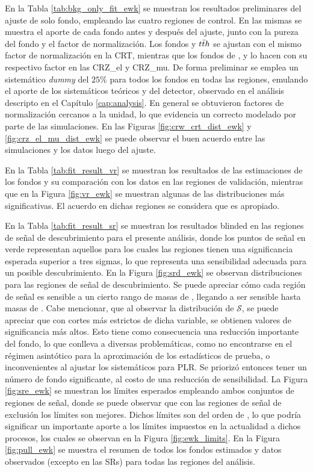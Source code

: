 En la Tabla \ref{tab:bkg_only_fit_ewk} se muestran los resultados preliminares del ajuste de solo fondo, empleando las cuatro regiones de control. En las mismas se muestra el aporte de cada fondo antes y después del ajuste, junto con la pureza del fondo y el factor de normalización. Los fondos \ttbarph y $t\bar{t} h$ se ajustan con el mismo factor de normalización en la CRT, mientras que los fondos de \znunuph, \zeeph y \zmumuph lo hacen con su respectivo factor en las CRZ\_el y CRZ\_mu. De forma preliminar se emplea un sistemático \textit{dummy} del $25\%$ para todos los fondos en todas las regiones, emulando el aporte de los sistemáticos teóricos y del detector, observado en el análisis descripto en el Capítulo \ref{cap:analysis}. En general se obtuvieron factores de normalización cercanos a la unidad, lo que evidencia un correcto modelado por parte de las simulaciones. En las Figuras \ref{fig:crw_crt_dist_ewk} y \ref{fig:crz_el_mu_dist_ewk} se puede observar el buen acuerdo entre las simulaciones y los datos luego del ajuste.


En la Tabla \ref{tab:fit_result_vr} se muestran los resultados de las estimaciones de los fondos y su comparación con los datos en las regiones de validación, mientras que en la Figura \ref{fig:vr_ewk} se muestran algunas de las distribuciones más significativas. El acuerdo en dichas regiones se considera que es apropiado. 

En la Tabla \ref{tab:fit_result_sr} se muestran los resultados blinded en las regiones de señal de descubrimiento para el presente análisis, donde los puntos de señal en verde representan aquellos para los cuales las regiones tienen una significancia esperada superior a tres sigmas, lo que representa una sensibilidad adecuada para un posible descubrimiento. En la Figura \ref{fig:srd_ewk} se observan distribuciones para las regiones de señal de descubrimiento. Se puede apreciar cómo cada región de señal es sensible a un cierto rango de masas de \ninoone, llegando a ser sensible hasta masas de . Cabe mencionar, que al observar la distribución de $\mathcal{S}$, se puede apreciar que con cortes más estrictos de dicha variable, se obtienen valores de significancia más altos. Esto tiene como consecuencia una reducción importante del fondo, lo que conlleva a diversas problemáticas, como no encontrarse en el régimen asintótico para la aproximación de los estadísticos de prueba, o inconvenientes al ajustar los sistemáticos para PLR. Se priorizó entonces tener un número de fondo significante, al costo de una reducción de sensibilidad.
La Figura \ref{fig:sre_ewk} se muestran los límites esperados empleando ambos conjuntos de regiones de señal, donde se puede observar que con las regiones de señal de exclusión los límites son mejores.
Dichos límites son del orden de , lo que podría significar un importante aporte a los límites impuestos en la actualidad a dichos procesos, los cuales se observan en la Figura \ref{fig:ewk_limits}.
En la Figura \ref{fig:pull_ewk} se muestra el resumen de todos los fondos estimados y datos observados (excepto en las SRs) para todas las regiones del análisis.

